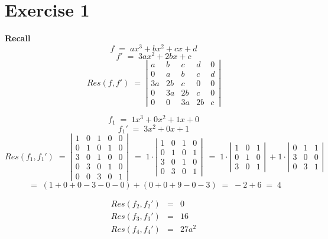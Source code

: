 \documentclass[a4paper]{scrreprt}
\begin{document}
\section*{Exercise 1}

\textbf{Recall}
\[ f\;=\;ax^3 + bx^2 + cx + d \]
\[ f' \;=\; 3ax^2 + 2bx + c \]
\[ \mathit{Res}(f,f') \;=\; \left|\begin{matrix}
    a & b & c & d & 0\\
    0 & a & b & c & d \\
    3a & 2b & c & 0 & 0 \\
    0 & 3a & 2b & c & 0 \\
    0 & 0 & 3a & 2b & c
\end{matrix}\right|\]

\[f_1 \;=\; 1x^3 + 0x^2 + 1x + 0\]
\[f_1' \;=\; 3x^2 + 0x + 1\]
\[\mathit{Res}(f_1,f_1') \;=\; \left|\begin{matrix}
    1 & 0 & 1 & 0 & 0\\
    0 & 1 & 0 & 1 & 0\\
    3 & 0 & 1 & 0 & 0\\
    0 & 3 & 0 & 1 & 0\\
    0 & 0 & 3 & 0 & 1
\end{matrix}\right|\ \;=\; 1\cdot\left|\begin{matrix}
    1 & 0 & 1 & 0\\
    0 & 1 & 0 & 1\\
    3 & 0 & 1 & 0\\
    0 & 3 & 0 & 1
\end{matrix}\right|\ \;=\; 1\cdot\left|\begin{matrix}
    1 & 0 & 1\\
    0 & 1 & 0\\
    3 & 0 & 1
\end{matrix}\right|\ + 1\cdot\left|\begin{matrix}
    0 & 1 & 1\\
    3 & 0 & 0\\
    0 & 3 & 1
\end{matrix}\right|\]
\[\;=\;(1 + 0 + 0 - 3 - 0 - 0) + (0 + 0 + 9 - 0 - 3) \;=\; -2 + 6 \;=\; 4\]

\smallskip

\begin{eqnarray*}
    \mathit{Res}(f_2, f_2') &=& 0\\
    \mathit{Res}(f_3, f_3') &=& 16\\
    \mathit{Res}(f_4, f_4') &=& 27a^2
\end{eqnarray*}
\end{document}
